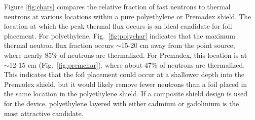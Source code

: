 \documentclass{mc2015}
\begin{document}
Figure \ref{fig:chars} compares the relative fraction of fast neutrons to thermal neutrons at various locations within a pure polyethylene or Premadex shield. The location at which the peak thermal flux occurs is an ideal candidate for foil placement. For polyethylene, Fig.\ \ref{fig:polychar} indicates that the maximum thermal neutron flux fraction occurs $\sim$15-20 cm away from the point source, where nearly 85\% of neutrons are thermalized. For Premadex, this location is at $\sim$12-15 cm (Fig.\ \ref{fig:premchar}), where about 47\% of neutrons are thermalized. This indicates that the foil placement could occur at a shallower depth into the Premadex shield, but it would likely remove fewer neutrons than a foil placed in the same location in the polyethylene shield. If a composite shield design is used for the device, polyethylene layered with either cadmium or gadolinium is the most attractive candidate. 
\end{document}
